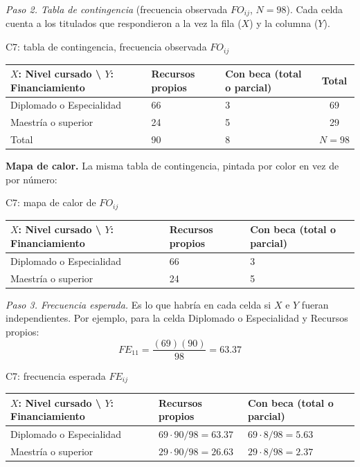 \textit{Paso 2. Tabla de contingencia} (frecuencia observada $FO_{ij}$, $N = 98$). Cada celda cuenta a los titulados que respondieron a la vez la fila ($X$) y la columna ($Y$).

\begin{mitabla}{C7: tabla de contingencia, frecuencia observada $FO_{ij}$}
\begin{tabular}{L{3.8cm}C{3.00cm}C{3.00cm}|c}
\toprule
$X$: Nivel cursado \textbackslash{} $Y$: Financiamiento & Recursos propios & Con beca (total o parcial) & Total \\
\midrule
Diplomado o Especialidad & 66 & 3 & 69 \\
Maestría o superior & 24 & 5 & 29 \\
\midrule
Total & 90 & 8 & $N = 98$ \\
\bottomrule
\end{tabular}
\end{mitabla}

\textbf{Mapa de calor.} La misma tabla de contingencia, pintada por color en vez de por número:

\begin{mitabla}{C7: mapa de calor de $FO_{ij}$}
\begin{tabular}{L{3.8cm}C{3.00cm}C{3.00cm}}
\toprule
$X$: Nivel cursado \textbackslash{} $Y$: Financiamiento & Recursos propios & Con beca (total o parcial) \\
\midrule
Diplomado o Especialidad & 66 & 3 \\
Maestría o superior & 24 & 5 \\
\bottomrule
\end{tabular}
\end{mitabla}

\textit{Paso 3. Frecuencia esperada.} Es lo que habría en cada celda si $X$ e $Y$ fueran independientes. Por ejemplo, para la celda Diplomado o Especialidad y Recursos propios:
\[
FE_{11} = \frac{(69)(90)}{98} = 63.37
\]

\begin{mitabla}{C7: frecuencia esperada $FE_{ij}$}
\begin{tabular}{L{3.8cm}C{3.00cm}C{3.00cm}}
\toprule
$X$: Nivel cursado \textbackslash{} $Y$: Financiamiento & Recursos propios & Con beca (total o parcial) \\
\midrule
Diplomado o Especialidad & $69\cdot90/98 = 63.37$ & $69\cdot8/98 = 5.63$ \\
Maestría o superior & $29\cdot90/98 = 26.63$ & $29\cdot8/98 = 2.37$ \\
\bottomrule
\end{tabular}
\end{mitabla}

